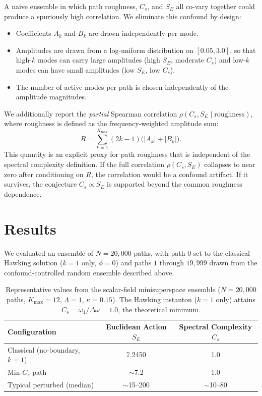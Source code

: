 \documentclass[11pt]{article}
\begin{document}
A naive ensemble in which path roughness, \(C_s\), and \(S_E\) all co-vary together could produce a
spuriously high correlation. We eliminate this confound by design:

\begin{itemize}
    \item Coefficients \(A_k\) and \(B_k\) are drawn independently per mode.
    \item Amplitudes are drawn from a log-uniform distribution on \([0.05, 3.0]\), so that high-\(k\) modes can carry large amplitudes (high \(S_E\), moderate \(C_s\)) and low-\(k\) modes can have small amplitudes (low \(S_E\), low \(C_s\)).
    \item The number of active modes per path is chosen independently of the amplitude magnitudes.
\end{itemize}

We additionally report the \emph{partial} Spearman correlation \(\rho(C_s, S_E \mid \text{roughness})\),
where roughness is defined as the frequency-weighted amplitude sum:
\[
R = \sum_{k=1}^{K_{\max}} (2k-1)\bigl(|A_k| + |B_k|\bigr).
\]
This quantity is an explicit proxy for path roughness that is independent of the spectral complexity definition.
If the full correlation \(\rho(C_s, S_E)\) collapses to near zero after conditioning on \(R\),
the correlation would be a confound artifact.
If it survives, the conjecture \(C_s \propto S_E\) is supported beyond the common roughness dependence.

\section{Results}

We evaluated an ensemble of \(N = 20{,}000\) paths, with path 0 set to the classical
Hawking solution (\(k = 1\) only, \(\phi = 0\)) and paths \(1\) through \(19{,}999\) drawn
from the confound-controlled random ensemble described above.

\begin{table}[h!]
\centering
\begin{tabular}{|l|c|c|}
\hline
Configuration & Euclidean Action \(S_E\) & Spectral Complexity \(C_s\) \\
\hline
Classical (no-boundary, \(k=1\)) & 7.2450 & 1.0 \\
Min-\(C_s\) path & \(\sim\)7.2 & 1.0 \\
Typical perturbed (median) & \(\sim\)15--200 & \(\sim\)10--80 \\
\hline
\end{tabular}
\caption{Representative values from the scalar-field minisuperspace ensemble (\(N = 20{,}000\) paths, \(K_{\max} = 12\), \(\Lambda=1\), \(\kappa=0.15\)). The Hawking instanton (\(k=1\) only) attains \(C_s = \omega_1/\Delta\omega = 1.0\), the theoretical minimum.}
\end{table}
\end{document}
